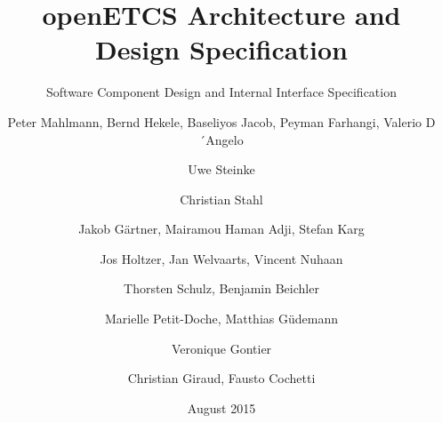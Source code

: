 \documentclass[oneside]{template/openetcs_report}
\begin{document}
\frontmatter
{}

\newcommand{\define}[1]{\index{#1}\emph{#1}}







\title{openETCS Architecture and Design Specification}

\subtitle{Software Component Design and Internal Interface Specification}

\date{August 2015}








\author{Peter Mahlmann, Bernd Hekele, Baseliyos Jacob, Peyman Farhangi, Valerio D´Angelo}

\author{Uwe Steinke}

\author{Christian Stahl}

\author{Jakob G\"artner, Mairamou Haman Adji, Stefan Karg}

\author{Jos Holtzer, Jan Welvaarts, Vincent Nuhaan}

\author{Thorsten Schulz, Benjamin Beichler}

\author{Marielle Petit-Doche, Matthias G\"udemann}

\author{Veronique Gontier}

\author{Christian Giraud, Fausto Cochetti}
\end{document}

